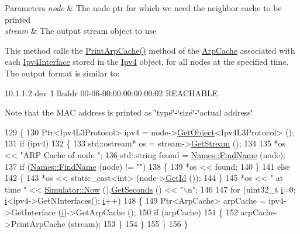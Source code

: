 \begin{DoxyParams}{Parameters}
{\em node} & The node ptr for which we need the neighbor cache to be printed \\
\hline
{\em stream} & The output stream object to use\\
\hline
\end{DoxyParams}
This method calls the \hyperlink{classns3_1_1Ipv4RoutingHelper_ae2bcc2aced34f45479b388fa16761e85}{Print\+Arp\+Cache()} method of the \hyperlink{classns3_1_1ArpCache}{Arp\+Cache} associated with each \hyperlink{classns3_1_1Ipv4Interface}{Ipv4\+Interface} stored in the \hyperlink{classns3_1_1Ipv4}{Ipv4} object, for all nodes at the specified time. The output format is similar to\+: \begin{DoxyVerb}10.1.1.2 dev 1 lladdr 00-06-00:00:00:00:00:02 REACHABLE
\end{DoxyVerb}
 Note that the M\+AC address is printed as \char`\"{}type\char`\"{}-\/\char`\"{}size\char`\"{}-\/\char`\"{}actual address\char`\"{} 
\begin{DoxyCode}
129 \{
130   Ptr<Ipv4L3Protocol> ipv4 = node->\hyperlink{classns3_1_1Object_a13e18c00017096c8381eb651d5bd0783}{GetObject}<Ipv4L3Protocol> ();
131   \textcolor{keywordflow}{if} (ipv4)
132     \{
133       std::ostream* os = stream->\hyperlink{classns3_1_1OutputStreamWrapper_a0cf30a4188ab6fdae2b2ab74db11acc2}{GetStream} ();
134 
135       *os << \textcolor{stringliteral}{"ARP Cache of node "};
136       std::string found = \hyperlink{classns3_1_1Names_ab9664faf23569aaae64a2d1f65265045}{Names::FindName} (node);
137       \textcolor{keywordflow}{if} (\hyperlink{classns3_1_1Names_ab9664faf23569aaae64a2d1f65265045}{Names::FindName} (node) != \textcolor{stringliteral}{""})
138         \{
139           *os << found;
140         \}
141       \textcolor{keywordflow}{else}
142         \{
143           *os << static\_cast<int> (node->\hyperlink{classns3_1_1Node_aaf49b64a843565ce3812326313b370ac}{GetId} ());
144         \}
145       *os << \textcolor{stringliteral}{" at time "} << \hyperlink{classns3_1_1Simulator_ac3178fa975b419f7875e7105be122800}{Simulator::Now} ().\hyperlink{classns3_1_1Time_a8f20d5c3b0902d7b4320982f340b57c8}{GetSeconds} () << \textcolor{stringliteral}{"\(\backslash\)n"};
146 
147       \textcolor{keywordflow}{for} (uint32\_t \hyperlink{bernuolliDistribution_8m_a6f6ccfcf58b31cb6412107d9d5281426}{i}=0; \hyperlink{bernuolliDistribution_8m_a6f6ccfcf58b31cb6412107d9d5281426}{i}<ipv4->GetNInterfaces(); \hyperlink{bernuolliDistribution_8m_a6f6ccfcf58b31cb6412107d9d5281426}{i}++)
148         \{
149           Ptr<ArpCache> arpCache = ipv4->GetInterface (\hyperlink{bernuolliDistribution_8m_a6f6ccfcf58b31cb6412107d9d5281426}{i})->GetArpCache ();
150           \textcolor{keywordflow}{if} (arpCache)
151             \{
152               arpCache->PrintArpCache (stream);
153             \}
154         \}
155     \}
156 \}
\end{DoxyCode}



